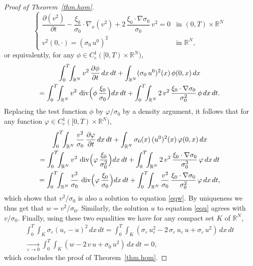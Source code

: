 \documentclass[11pt]{article}
\let \ph \varphi
\def \RR {\mathbb R}
\theoremstyle{plain}
\theoremstyle{definition}
\numberwithin{equation}{section}
\begin{document}
\begin{proof}[Proof of Theorem~\ref{thm.hom}]
\[
\begin{cases}
\dfrac{\partial(v^2)}{\partial t}-\dfrac{\xi_0}{\sigma_0}\cdot\nabla_x(v^2)+2\, \dfrac{\xi_0\cdot\nabla\sigma_0}{\sigma_0}\,v^2=0 & \mbox{in }(0,T)\times\RR^N
\\[5pt]
v^2(0,\cdot)=(\sigma_0\, u^0)^2 & \mbox{in }\RR^N,
\end{cases}
\]
or equivalently, for any $\phi\in C^1_c([0,T)\times\RR^N)$,
\begin{multline*}
 \int_0^T\!\!\int_{\RR^N}v^2\, \dfrac{\partial\phi}{\partial t}\,dx\,dt+\int_{\RR^N}(\sigma_0\, u^0)^2(x)\,\phi(0,x)\,dx
\\
=\int_0^T\!\!\int_{\RR^N}v^2\,\div\Bigl(\phi\, \dfrac{\xi_0}{\sigma_0}\Bigr)dx\,dt+\int_0^T\!\!\int_{\RR^N}2\,v^2\, \dfrac{\xi_0\cdot\nabla\sigma_0}{\sigma_0^2}\,\phi\,dx\,dt.
\end{multline*}
Replacing the test function $\phi$ by $\ph/\sigma_0$ by a density argument, it follows that for any function $\ph\in C^1_c([0,T)\times\RR^N)$,
\begin{multline*}
 \int_0^T\!\!\int_{\RR^N} \dfrac{v^2}{\sigma_0}\, \dfrac{\partial\ph}{\partial t}\,dx\,dt+\int_{\RR^N}\sigma_0(x)\,(u^0)^2(x)\,\ph(0,x)\,dx
\\
=\int_0^T\!\!\int_{\RR^N}v^2\,\div\Bigl(\ph\, \dfrac{\xi_0}{\sigma_0^2}\Bigr)dx\,dt+\int_0^T\!\!\int_{\RR^N}2\,v^2\, \dfrac{\xi_0\cdot\nabla\sigma_0}{\sigma_0^3}\,\ph\,dx\,dt
\\
=\int_0^T\!\!\int_{\RR^N} \dfrac{v^2}{\sigma_0}\,\div\Bigl(\ph\, \dfrac{\xi_0}{\sigma_0}\Bigr)dx\,dt+\int_0^T\!\!\int_{\RR^N} \dfrac{v^2}{\sigma_0}\, \dfrac{\xi_0\cdot\nabla\sigma_0}{\sigma_0^2}\,\ph\,dx\,dt,
\end{multline*}
which shows that $v^2/\sigma_0$ is also a solution to equation \eqref{eqw}. By uniqueness we thus get that $w=v^2/\sigma_0$.
Similarly, the solution $u$ to equation \eqref{equ} agrees with $v/\sigma_0$.
Finally, using these two equalities we have for any compact set $K$ of $\RR^N$,
\begin{multline*}
 \int_0^T\!\!\int_{K}\sigma_\varepsilon(u_\varepsilon-u)^2\,dx\,dt=\int_0^T\!\!\int_{K}(\sigma_\varepsilon\,u_\varepsilon^2-2\,\sigma_\varepsilon\,u_\varepsilon\,u+\sigma_\varepsilon\,u^2)\,dx\,dt
\\[-8pt]
\xrightarrow[\varepsilon\to 0]\;\int_0^T\!\!\int_{K}(w-2\,v\,u+\sigma_0\,u^2)\,dx\,dt=0,
\end{multline*}
which concludes the proof of Theorem~\ref{thm.hom}.
\end{proof}
\end{document}
